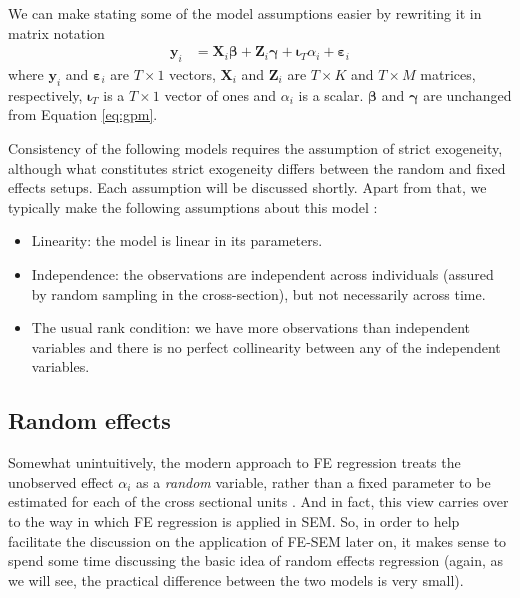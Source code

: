 \documentclass[]{interact}
\theoremstyle{plain}%
\theoremstyle{definition}
\theoremstyle{remark}
\def\tightlist{}
\begin{document}
We can make stating some of the model assumptions easier by rewriting it
in matrix notation \begin{align}
\bm{y}_{i} & = \bm{X}_{i}\bm{\beta} + \bm{Z}_{i}\bm{\gamma} + \bm{\iota}_{T}\alpha_{i} + \bm{\varepsilon}_{i}
\end{align} where \(\bm{y}_{i}\) and \(\bm{\varepsilon}_{i}\) are
\(T \times 1\) vectors, \(\bm{X}_{i}\) and \(\bm{Z}_{i}\) are
\(T \times K\) and \(T \times M\) matrices, respectively,
\(\bm{\iota}_{T}\) is a \(T \times 1\) vector of ones and \(\alpha_{i}\)
is a scalar. \(\bm{\beta}\) and \(\bm{\gamma}\) are unchanged from
Equation \eqref{eq:gpm}.

Consistency of the following models requires the assumption of strict
exogeneity, although what constitutes strict exogeneity differs between
the random and fixed effects setups. Each assumption will be discussed
shortly. Apart from that, we typically make the following assumptions
about this model \citep[see, e.g.,][]{Wooldridge2002, Schmidheiny2019}:

\begin{itemize}
\tightlist
\item
  Linearity: the model is linear in its parameters.
\item
  Independence: the observations are independent across individuals
  (assured by random sampling in the cross-section), but not necessarily
  across time.
\item
  The usual rank condition: we have more observations than independent
  variables and there is no perfect collinearity between any of the
  independent variables.
\end{itemize}

\hypertarget{re}{%
\subsection{Random effects}\label{re}}

Somewhat unintuitively, the modern approach to FE regression treats the
unobserved effect \(\alpha_{i}\) as a \textit{random} variable, rather
than a fixed parameter to be estimated for each of the cross sectional
units \citep{Wooldridge2002}. And in fact, this view carries over to the
way in which FE regression is applied in SEM. So, in order to help
facilitate the discussion on the application of FE-SEM later on, it
makes sense to spend some time discussing the basic idea of random
effects regression (again, as we will see, the practical difference
between the two models is very small).
\end{document}
